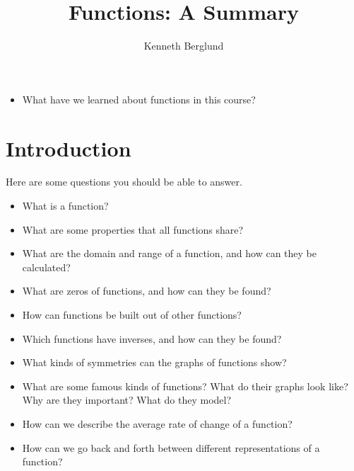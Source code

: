 \documentclass{ximera}
\author{Kenneth Berglund}
\title{Functions: A Summary}
\begin{document}
\begin{abstract}
\end{abstract}
\maketitle
%
%
%
\begin{motivatingQuestions}\begin{itemize}
\item What have we learned about functions in this course?
\end{itemize}\end{motivatingQuestions}
%
%
%
\section{Introduction}
%
Here are some questions you should be able to answer. 
\begin{itemize}
\item What is a function?
\item What are some properties that all functions share?
\item What are the domain and range of a function, and how can they be calculated?
\item What are zeros of functions, and how can they be found? 
\item How can functions be built out of other functions? 
\item Which functions have inverses, and how can they be found?
\item What kinds of symmetries can the graphs of functions show?
\item What are some famous kinds of functions? What do their graphs look like? Why are they important? What do they model?
\item How can we describe the average rate of change of a function?
\item How can we go back and forth between different representations of a function?
\end{itemize}
\end{document}
